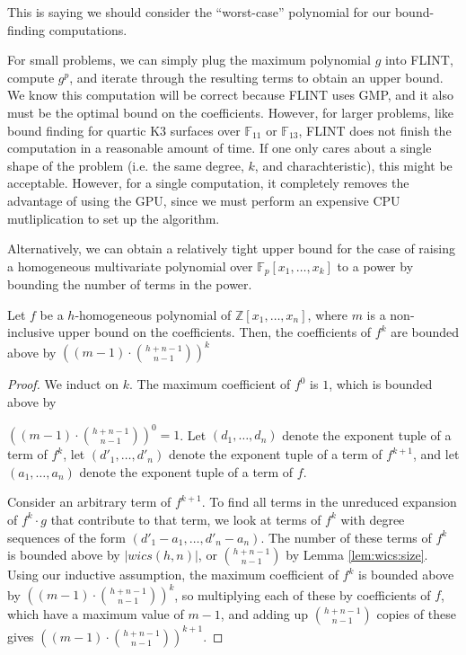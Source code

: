 This is saying we should consider the ``worst-case'' polynomial 
for our bound-finding computations.

For small problems, we can simply plug the maximum 
polynomial $g$ into FLINT, compute $g ^ p$, and 
iterate through the resulting terms to obtain an upper bound.
We know this computation will be correct because FLINT uses GMP,
and it also must be the optimal bound on the coefficients. 
However, for larger problems, like bound finding for 
quartic K3 surfaces over $\mathbb{F}_{11}$ or $\mathbb{F}_{13}$, 
FLINT does not finish the computation in a reasonable amount of time.
If one only cares about a single shape of the problem 
(i.e. the same degree, \(k\), and charachteristic),
this might be acceptable.
However, for a single computation, it completely removes 
the advantage of using the GPU, since we must perform an 
expensive CPU mutliplication to set up the algorithm.

Alternatively, we can obtain a relatively tight upper 
bound for the case of raising a homogeneous multivariate 
polynomial over $\mathbb{F}_p[x_1, \dots , x_k]$ to a power
by bounding the number of terms in the power. 

\begin{thm}
    Let $f$ be a $h$-homogeneous polynomial of $\mathbb{Z}[x_1, \dots, x_n]$, where $m$ is a non-inclusive upper bound on the coefficients. Then, the coefficients of $f ^ k$ are bounded above by $\left((m - 1) \cdot \binom{h + n - 1}{n - 1}\right)^ k$
\end{thm}

\begin{proof}
    We induct on $k$. The maximum coefficient of $f^0$ is $1$, which is bounded above by 
    
    \noindent$\left((m - 1) \cdot \binom{h + n - 1}{n - 1}\right)^ 0 = 1$.
    Let $(d_1, \dots , d_n)$ denote the exponent tuple of a term of $f^k$, let $(d'_1, \dots , d'_n)$ denote the exponent tuple of a term of $f^{k + 1}$, and let $(a_1, \dots , a_n)$ denote the exponent tuple of a term of $f$.

    Consider an arbitrary term of $f^{k + 1}$. To find all terms in the unreduced expansion of $f^k \cdot g$ that contribute to that term, we look at terms of $f^k$ with degree sequences of the form $(d'_1 - a_1, \dots , d'_n - a_n)$. The number of these terms of $f^k$ is bounded above by $|wics(h, n)|$, or $\binom{h + n - 1}{n - 1}$ by Lemma \ref{lem:wics:size}. Using our inductive assumption, the maximum coefficient of $f^k$ is bounded above by $\left((m - 1) \cdot \binom{h + n - 1}{n - 1}\right)^ k$, so multiplying each of these by coefficients of $f$, which have a maximum value of $m - 1$, and adding up $\binom{h + n - 1}{n - 1}$ copies of these gives $\left((m - 1) \cdot \binom{h + n - 1}{n - 1}\right)^{k + 1}$.
\end{proof}


